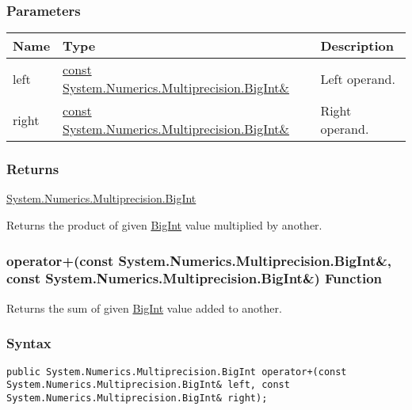 \documentclass[a4paper,oneside,11.000000pt]{book}
\begin{document}
\subsubsection*{Parameters}
\begin{flushleft}
\begin{supertabular}[l]{!{\raggedright}p{1.30721cm}!{\raggedright}p{8.55945cm}!{\raggedright}p{3.66839cm}}
\textbf{Name}
& \textbf{Type}
& \textbf{Description}
\\
\hline
left
& \hyperlink{System.Numerics.Multiprecision.BigInt}{const System.\-Numerics.\-Multiprecision.\-BigInt\&\-}
& Left operand.

\\
right
& \hyperlink{System.Numerics.Multiprecision.BigInt}{const System.\-Numerics.\-Multiprecision.\-BigInt\&\-}
& Right operand.

\\
\end{supertabular}

\end{flushleft}
\subsubsection*{Returns}
\hyperlink{System.Numerics.Multiprecision.BigInt}{System.\-Numerics.\-Multiprecision.\-BigInt}
\begin{flushleft}
Returns the product of given \hyperlink{System.Numerics.Multiprecision.BigInt}{BigInt} value multiplied by another.

\end{flushleft}
\clearpage

\hypertarget{System.Numerics.Multiprecision.operator.plus.C.R.System.Numerics.Multiprecision.BigInt.C.R.System.Numerics.Multiprecision.BigInt}{\subsubsection*{operator+(const System.Numerics.Multiprecision.BigInt\&, const System.Numerics.Multiprecision.BigInt\&) Function}}
\begin{flushleft}
Returns the sum of given \hyperlink{System.Numerics.Multiprecision.BigInt}{BigInt} value added to another.

\end{flushleft}
\subsubsection*{Syntax}
\texttt{public System.Numerics.Multiprecision.BigInt operator+(const System.Numerics.Multiprecision.BigInt\& left, const System.Numerics.Multiprecision.BigInt\& right);}
\end{document}
